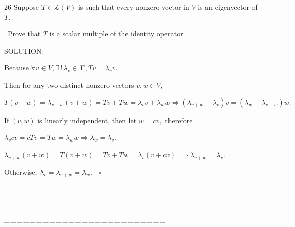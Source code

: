 \documentclass[a4paper, 11pt, UTF8]{article}
\def\Lm{\mathcal{L}}
\def\Fbfc{$\,{\timesbf F}$}
\begin{document}
\begin{large}
{\timesbf\Large 26} {\timessl\Large 
Suppose $T\in\Lm(V)$ is such that every nonzero vector in $V$ is an eigenvector of $T$.}\par\quad\,
{\timessl\Large Prove that $T$ is a scalar multiple of the identity operator.}\par
{\timesbf S\footnotesize{OLUTION:}}\par\quad
Because $\forall v\in V,\exists\,!\,\lambda_v\in\Fbfc,Tv=\lambda_v v.$\par\quad
Then for any two distinct nonzero vectors $v,w\in V,$\par\quad
$T(v+w)=\lambda_{v+w}(v+w)=Tv+Tw=\lambda_v v+\lambda_w w\Rightarrow(\lambda_{v+w}-\lambda_v)v=(\lambda_w-\lambda_{v+w})w.$\par\quad
If $(v,w)$ is linearly independent, then let $w=cv,$ therefore\par\qquad\qquad\qquad
$\lambda_v cv=cTv=Tw=\lambda_w w$\qquad\qquad\qquad\qquad\qquad\quad$\Rightarrow\lambda_w=\lambda_v.$\par\qquad\qquad\qquad
$\lambda_{v+w}(v+w)=T(v+w)=Tv+Tw=\lambda_v(v+cv)$ $\,\Rightarrow \lambda_{v+w}=\lambda_v.$\par\quad
Otherwise, $\lambda_v=\lambda_{v+w}=\lambda_w.\quad\square$
\par
{\tiny \_\,\_\,\_\,\_\,\_\,\_\,\_\,\_\,\_\,\_\,\_\,\_\,\_\,\_\,\_\,\_\,\_\,\_\,\_\,\_\,\_\,\_\,\_\,\_\,\_\,\_\,\_\,\_\,\_\,\_\,\_\,\_\,\_\,\_\,\_\,\_\,\_\,\_\,\_\,\_\,\_\,\_\,\_\,\_\,\_\,\_\,\_\,\_\,\_\,\_\,\_\,\_\,\_\,\_\,\_\,\_\,\_\,\_\,\_\,\_\,\_\,\_\,\_\,\_\,\_\,\_\,\_\,\_\,\_\,\_\,\_\_\,\_\,\_\,\_\,\_\,\_\,\_\,\_\,\_\,\_\,\_\,\_\,\_\,\_\,\_\,\_\,\_\,\_\,\_\,\_\,\_\,\_\,\_\,\_\,\_\,\_\,\_\,\_\,\_\,\_\,\_\,\_\,\_\,\_\,\_\,\_\,\_\,\_\,\_\,\_\,\_\,\_\,\_\,\_\,\_\,\_\,\_\,\_\,\_\,\_\,\_\,\_\,\_\,\_\,\_\,\_\,\_\,\_\,\_\,\_\,\_\,\_\,\_\,\_\,\_\,\_\,\_\,\_\,\_\,\_\,\_}{\tiny\,\par}


\end{large}
\end{document}
